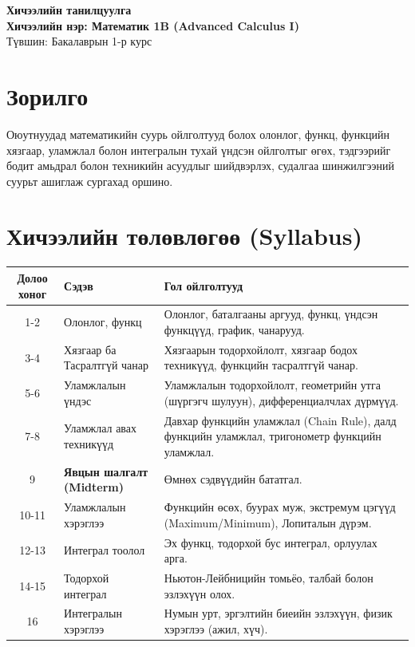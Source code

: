 \begin{center}
    \LARGE \textbf{Хичээлийн танилцуулга} \\
    \vspace{0.3cm}
    \Large \textbf{Хичээлийн нэр: Математик 1B (Advanced Calculus I)} \\
    \large Түвшин: Бакалаврын 1-р курс
\end{center}

\section*{Зорилго}
Оюутнуудад математикийн суурь ойлголтууд болох олонлог, функц, функцийн хязгаар, уламжлал болон интегралын тухай үндсэн ойлголтыг өгөх, тэдгээрийг бодит амьдрал болон техникийн асуудлыг шийдвэрлэх, судалгаа шинжилгээний суурьт ашиглаж сургахад оршино.
\section*{Хичээлийн төлөвлөгөө (Syllabus)}
\renewcommand{\arraystretch}{1.5} %
\begin{table}[ht]
\centering
\small
\begin{tabular}{|c|p{4cm}|p{8cm}|}
\hline
\textbf{Долоо хоног} & \textbf{Сэдэв} & \textbf{Гол ойлголтууд} \\ \hline
1-2 & Олонлог, функц & Олонлог, баталгааны аргууд, функц, үндсэн функцүүд, график, чанарууд. \\ \hline
3-4 & Хязгаар ба Тасралтгүй чанар & Хязгаарын тодорхойлолт, хязгаар бодох техникүүд, функцийн тасралтгүй чанар. \\ \hline
5-6 & Уламжлалын үндэс & Уламжлалын тодорхойлолт, геометрийн утга (шүргэгч шулуун), дифференциалчлах дүрмүүд. \\ \hline
7-8 & Уламжлал авах техникүүд & Давхар функцийн уламжлал (Chain Rule), далд функцийн уламжлал, тригонометр функцийн уламжлал. \\ \hline
9 & \textbf{Явцын шалгалт (Midterm)} & Өмнөх сэдвүүдийн бататгал. \\ \hline
10-11 & Уламжлалын хэрэглээ & Функцийн өсөх, буурах муж, экстремум цэгүүд (Maximum/Minimum), Лопиталын дүрэм. \\ \hline
12-13 & Интеграл тоолол & Эх функц, тодорхой бус интеграл, орлуулах арга. \\ \hline
14-15 & Тодорхой интеграл & Ньютон-Лейбницийн томьёо, талбай болон эзлэхүүн олох. \\ \hline
16 & Интегралын хэрэглээ & Нумын урт, эргэлтийн биеийн эзлэхүүн, физик хэрэглээ (ажил, хүч). \\ \hline
\end{tabular}
\end{table}
